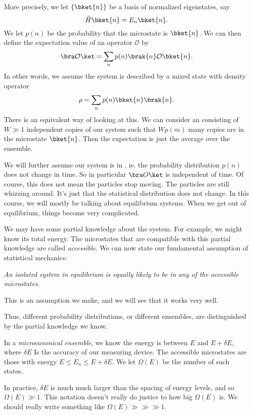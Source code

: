 \documentclass[a4paper]{article}
\begin{document}
More precisely, we let $\{\bket{n}\}$ be a basis of normalized eigenstates, say
\[
  \hat{H}\bket{n} = E_n \bket{n}.
\]
We let $p(n)$ be the probability that the microstate is $\bket{n}$. We can then define the expectation value of an operator $\mathcal{O}$ by
\[
  \bra \mathcal{O}\ket = \sum_n p(n) \brak{n}\mathcal{O}\bket{n}.
\]
In other words, we assume the system is described by a mixed state with density operator
\[
  \rho = \sum_n p(n) \bket{n}\brak{n}.
\]
There is an equivalent way of looking at this. We can consider an  consisting of $W \gg 1$ independent copies of our system such that $Wp(m)$ many copies are in the microstate $\bket{n}$. Then the expectation is just the average over the ensemble.

We will further assume our system is in , ie. the probability distribution $p(n)$ does not change in time. So in particular $\bra O\ket$ is independent of time. Of course, this does not mean the particles stop moving. The particles are still whizzing around. It's just that the statistical distribution does not change. In this course, we will mostly be talking about equilibrium systems. When we get out of equilibrium, things become very complicated.

We may have some partial knowledge about the system. For example, we might know its total energy. The microstates that are compatible with this partial knowledge are called \emph{accessible}. We can now state our fundamental assumption of statistical mechanics:
\begin{center}
  \emph{An isolated system in equilibrium is equally likely to be in any of the accessible microstates.}
\end{center}
This is an assumption we make, and we will see that it works very well.

Thus, different probability distributions, or different ensembles, are distinguished by the partial knowledge we know.
\begin{defi}
  In a \emph{microcanonical ensemble}, we know the energy is between $E$ and $E + \delta E$, where $\delta E$ Is the accuracy of our measuring device. The accessible microstates are those with energy $E \leq E_n \leq E + \delta E$. We let $\Omega(E)$ be the number of such states.
\end{defi}
In practice, $\delta E$ is much much larger than the spacing of energy levels, and so $\Omega(E) \gg 1$. This notation doesn't really do justice to how big $\Omega(E)$ is. We should really write something like $\Omega(E) \gg{}\gg{}\gg 1$.
\end{document}
